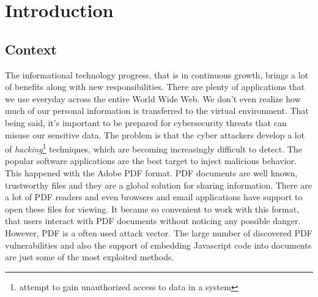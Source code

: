 \chapter{Introduction}
\label{chapter:introduction}

\section{Context}
\label{section:context} 
The informational technology progress, that is in continuous growth, brings a lot of benefits along with new responsibilities. There are plenty of applications that we use everyday across the entire World Wide Web. We don't even realize how much of our personal information is transferred to the virtual environment. That being said, it's important to be prepared for cybersecurity threats that can misuse our sensitive data. The problem is that the cyber attackers develop a lot of \textit{hacking}\footnote{attempt to gain unauthorized access to data in a system} techniques, which are becoming increasingly difficult to detect. The popular software applications are the best target to inject malicious behavior. This happened with the Adobe PDF format. PDF documents are well known, trustworthy files and they are a global solution for sharing information. There are a lot of PDF readers and even browsers and email applications have support to open these files for viewing. It became so convenient to work with this format, that users interact with PDF documents without noticing any possible danger. However, PDF is a often used attack vector. The large number of discovered PDF vulnerabilities and also the support of embedding Javascript code into documents are just some of the most exploited methods.


